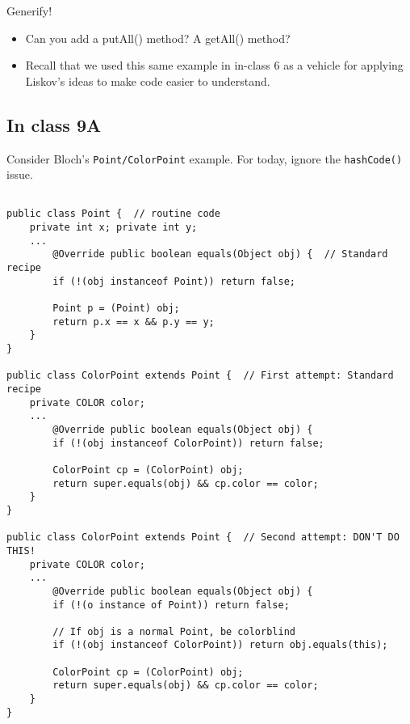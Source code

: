 \documentclass[11pt]{article}
\begin{document}
Generify!
\begin{itemize}
\item Can you add a putAll() method? A getAll() method?
\item Recall that we used this same example in in-class 6 as a vehicle for applying Liskov's ideas to make code easier to understand.
\end{itemize}

\subsection{In class 9A}
\label{sec:org94da596}
Consider Bloch's \texttt{Point/ColorPoint} example. For today, ignore the \texttt{hashCode()} issue.

\begin{verbatim}

public class Point {  // routine code
    private int x; private int y;    
    ...
        @Override public boolean equals(Object obj) {  // Standard recipe
        if (!(obj instanceof Point)) return false;

        Point p = (Point) obj;
        return p.x == x && p.y == y;
    }
}

public class ColorPoint extends Point {  // First attempt: Standard recipe
    private COLOR color;
    ...
        @Override public boolean equals(Object obj) {
        if (!(obj instanceof ColorPoint)) return false;

        ColorPoint cp = (ColorPoint) obj;
        return super.equals(obj) && cp.color == color;
    }
}

public class ColorPoint extends Point {  // Second attempt: DON'T DO THIS!
    private COLOR color;
    ...
        @Override public boolean equals(Object obj) {
        if (!(o instance of Point)) return false;

        // If obj is a normal Point, be colorblind
        if (!(obj instanceof ColorPoint)) return obj.equals(this);

        ColorPoint cp = (ColorPoint) obj;
        return super.equals(obj) && cp.color == color;
    }
}
\end{verbatim}
\end{document}
